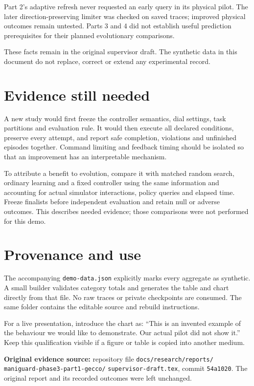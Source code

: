 \documentclass[10pt,a4paper,twocolumn]{article}
\begin{document}
Part 2's adaptive refresh never requested an early query in its physical pilot.
The later direction-preserving limiter was checked on saved traces; improved
physical outcomes remain untested. Parts 3 and 4 did not establish useful prediction
prerequisites for their planned evolutionary comparisons.

These facts remain in the original supervisor draft. The synthetic data in this
document do not replace, correct or extend any experimental record.

\section{Evidence still needed}
A new study would first freeze the controller semantics, dial settings, task
partitions and evaluation rule. It would then execute all declared conditions,
preserve every attempt, and report safe completion, violations and unfinished
episodes together. Command limiting and feedback timing should be isolated so
that an improvement has an interpretable mechanism.

To attribute a benefit to evolution, compare it with matched random search,
ordinary learning and a fixed controller using the same information and accounting
for actual simulator interactions, policy queries and elapsed time. Freeze
finalists before independent evaluation and retain null or adverse outcomes.
This describes needed evidence; those comparisons were not performed for this demo.

\section{Provenance and use}
The accompanying \texttt{demo-data.json} explicitly marks every aggregate as
synthetic. A small builder validates category totals and generates the table and
chart directly from that file. No raw traces or private checkpoints are consumed.
The same folder contains the editable source and rebuild instructions.

For a live presentation, introduce the chart as: ``This is an invented example
of the behaviour we would like to demonstrate. Our actual pilot did not show it.''
Keep this qualification visible if a figure or table is copied into another medium.

\begingroup\raggedright\small
\textbf{Original evidence source:} repository file
\texttt{docs/research/reports/}\allowbreak
\texttt{maniguard-phase3-part1-gecco/}\allowbreak
\texttt{supervisor-draft.tex}, commit \texttt{54a1020}.
The original report and its recorded outcomes were left unchanged.
\par\endgroup
\end{document}
